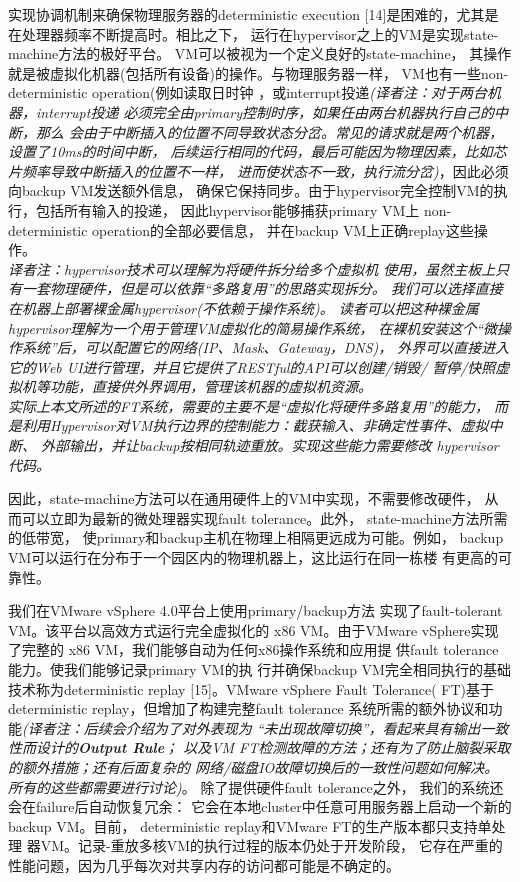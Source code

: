 实现协调机制来确保物理服务器的deterministic execution%
[14]是困难的，尤其是在处理器频率不断提高时。相比之下，%
运行在hypervisor之上的VM是实现state-machine方法的极好平台。%
VM可以被视为一个定义良好的state-machine，%
其操作就是被虚拟化机器(包括所有设备)的操作。与物理服务器一样，%
VM也有一些non-deterministic operation(例如读取日时钟%
，或interrupt投递\emph{(译者注：对于两台机器，interrupt投递%
必须完全由primary控制时序，如果任由两台机器执行自己的中断，那么%
会由于中断插入的位置不同导致状态分岔。常见的请求就是两个机器，设置了10ms的时间中断，%
后续运行相同的代码，最后可能因为物理因素，比如芯片频率导致中断插入的位置不一样，%
进而使状态不一致，执行流分岔)}，因此必须向backup VM发送额外信息，%
确保它保持同步。由于hypervisor完全控制VM的执行，包括所有输入的投递，%
因此hypervisor能够捕获primary VM上%
non-deterministic operation的全部必要信息，%
并在backup VM上正确replay这些操作。%
\\\emph{译者注：hypervisor技术可以理解为将硬件拆分给多个虚拟机%
使用，虽然主板上只有一套物理硬件，但是可以依靠“多路复用”的思路实现拆分。%
我们可以选择直接在机器上部署裸金属hypervisor(不依赖于操作系统)。%
读者可以把这种裸金属hypervisor理解为一个用于管理VM虚拟化的简易操作系统，%
在裸机安装这个“微操作系统”后，可以配置它的网络(IP、Mask、Gateway，DNS)，%
外界可以直接进入它的Web UI进行管理，并且它提供了RESTful的API可以创建/销毁/%
暂停/快照虚拟机等功能，直接供外界调用，管理该机器的虚拟机资源。%
\\实际上本文所述的FT系统，需要的主要不是“虚拟化将硬件多路复用”的能力，
而是利用Hypervisor对VM执行边界的控制能力：截获输入、非确定性事件、虚拟中断、%
外部输出，并让backup按相同轨迹重放。实现这些能力需要修改%
hypervisor代码。}%

因此，state-machine方法可以在通用硬件上的VM中实现，不需要修改硬件，%
从而可以立即为最新的微处理器实现fault tolerance。此外，%
state-machine方法所需的低带宽，%
使primary和backup主机在物理上相隔更远成为可能。例如，%
backup VM可以运行在分布于一个园区内的物理机器上，这比运行在同一栋楼%
有更高的可靠性。%

我们在VMware vSphere 4.0平台上使用primary/backup方法%
实现了fault-tolerant VM。该平台以高效方式运行完全虚拟化的%
x86 VM。由于VMware vSphere实现了完整的%
x86 VM，我们能够自动为任何x86操作系统和应用提%
供fault tolerance能力。使我们能够记录primary VM的执%
行并确保backup VM完全相同执行的基础技术称为deterministic replay%
[15]。VMware vSphere Fault Tolerance(%
FT)基于deterministic replay，但增加了构建完整fault tolerance%
系统所需的额外协议和功能\emph{(译者注：后续会介绍为了对外表现为%
“未出现故障切换”，看起来具有输出一致性而设计的\textbf{Output Rule}；%
以及VM FT检测故障的方法；还有为了防止脑裂采取的额外措施；还有后面复杂的%
网络/磁盘IO故障切换后的一致性问题如何解决。所有的这些都需要进行讨论)}。%
除了提供硬件fault tolerance之外，%
我们的系统还会在failure后自动恢复冗余：%
它会在本地cluster中任意可用服务器上启动一个新的backup VM。目前，%
deterministic replay和VMware FT的生产版本都只支持单处理%
器VM。记录-重放多核VM的执行过程的版本仍处于开发阶段，%
它存在严重的性能问题，因为几乎每次对共享内存的访问都可能是不确定的。%

